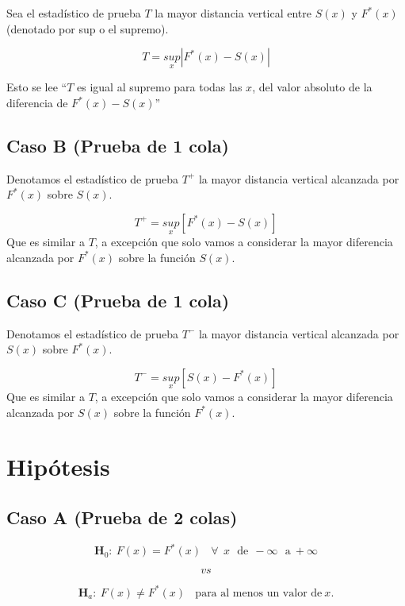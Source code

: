 \documentclass[
  a4paper,
  oneside,
  openany]{book}
\begin{document}
Sea el estadístico de prueba \(T\) la mayor distancia vertical entre \(S(x)\) y \(F^*(x)\)(denotado por sup o el supremo).

\[T=\underset{x}{sup}|F^*(x)-S(x)|\]

Esto se lee ``\(T\) es igual al supremo para todas las \(x\), del valor absoluto de la diferencia de \(F^*(x)-S(x)\)''

\hypertarget{caso-b-prueba-de-1-cola}{%
\subsection*{Caso B (Prueba de 1 cola)}\label{caso-b-prueba-de-1-cola}}


Denotamos el estadístico de prueba \(T^+\) la mayor distancia vertical alcanzada por \(F^*(x)\) sobre \(S(x)\).

\[T^+=\underset{x}{sup}[F^*(x)-S(x)] \]
Que es similar a \(T\), a excepción que solo vamos a considerar la mayor diferencia alcanzada por \(F^*(x)\) sobre la función \(S(x)\).

\hypertarget{caso-c-prueba-de-1-cola}{%
\subsection*{Caso C (Prueba de 1 cola)}\label{caso-c-prueba-de-1-cola}}


Denotamos el estadístico de prueba \(T^-\) la mayor distancia vertical alcanzada por \(S(x)\) sobre \(F^*(x)\).

\[T^-=\underset{x}{sup}[S(x)-F^*(x)] \]
Que es similar a \(T\), a excepción que solo vamos a considerar la mayor diferencia alcanzada por \(S(x)\) sobre la función \(F^*(x)\).

\hypertarget{hipuxf3tesis-14}{%
\section{Hipótesis}\label{hipuxf3tesis-14}}

\hypertarget{caso-a-prueba-de-2-colas-1}{%
\subsection*{Caso A (Prueba de 2 colas)}\label{caso-a-prueba-de-2-colas-1}}


\[\textbf{H}_0:\ F(x)=F^*(x) \ \ \ \ \forall \ \ x \ \ \  \mbox{de}\  \ -\infty \ \ \ \mbox{a} \  +\infty \]

\[vs\]

\[\textbf{H}_a: \ F(x) \neq F^*(x) \ \ \ \ \mbox{para al menos un  valor de} \   x.\]
\end{document}
